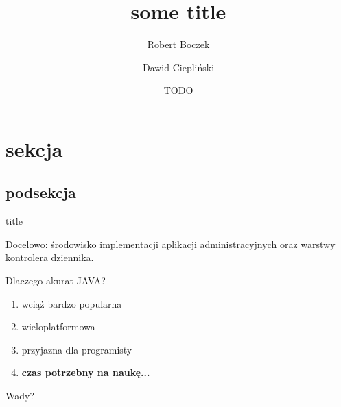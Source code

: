 \documentclass{beamer}
\title{some title}
\author{Robert Boczek \and Dawid Ciepliński}
\date{TODO}
\begin{document}
\begin{frame}

	\titlepage

\end{frame}


\section{sekcja}

	\subsection{podsekcja}

		\begin{frame}{title}

			Docelowo: środowisko implementacji aplikacji administracyjnych oraz warstwy kontrolera dziennika.
			
		        \medskip
			
			Dlaczego akurat JAVA?

			\begin{enumerate}
				\item wciąż bardzo popularna
				\item wieloplatformowa
				\item przyjazna dla programisty
				\item \textbf{czas potrzebny na naukę...}
			\end{enumerate}
			
			\medskip
			
			Wady?
			
		\end{frame}
\end{document}

